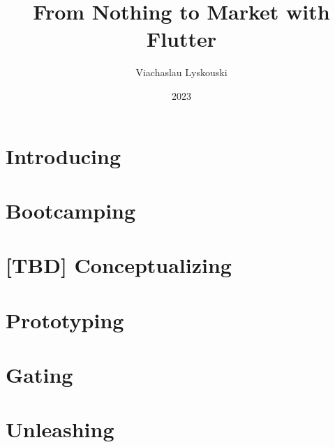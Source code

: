 \documentclass[12pt, a4paper, twoside]{extreport}
\author{Viachaslau Lyskouski}
\title{From Nothing to Market with Flutter}
\date{2023}
\begin{document}


\maketitle

%

\tableofcontents



\newpage
\section*{Introducing}


\newpage
\section{Bootcamping}



\newpage
\section{[TBD] Conceptualizing}


\newpage
\section{Prototyping}


\newpage





\newpage
\section{Gating}







\newpage
\section{Unleashing}






\end{document}

